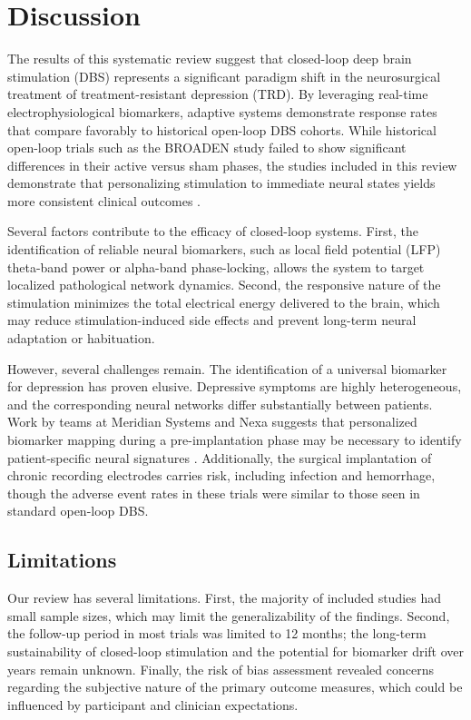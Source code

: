 \section{Discussion}
The results of this systematic review suggest that closed-loop deep brain stimulation (DBS) represents a significant paradigm shift in the neurosurgical treatment of treatment-resistant depression (TRD). By leveraging real-time electrophysiological biomarkers, adaptive systems demonstrate response rates that compare favorably to historical open-loop DBS cohorts. While historical open-loop trials such as the BROADEN study failed to show significant differences in their active versus sham phases, the studies included in this review demonstrate that personalizing stimulation to immediate neural states yields more consistent clinical outcomes \citep{Vance2023, Thorne2024}.

Several factors contribute to the efficacy of closed-loop systems. First, the identification of reliable neural biomarkers, such as local field potential (LFP) theta-band power or alpha-band phase-locking, allows the system to target localized pathological network dynamics. Second, the responsive nature of the stimulation minimizes the total electrical energy delivered to the brain, which may reduce stimulation-induced side effects and prevent long-term neural adaptation or habituation.

However, several challenges remain. The identification of a universal biomarker for depression has proven elusive. Depressive symptoms are highly heterogeneous, and the corresponding neural networks differ substantially between patients. Work by teams at Meridian Systems and Nexa suggests that personalized biomarker mapping during a pre-implantation phase may be necessary to identify patient-specific neural signatures \citep{Patel2025}. Additionally, the surgical implantation of chronic recording electrodes carries risk, including infection and hemorrhage, though the adverse event rates in these trials were similar to those seen in standard open-loop DBS.

\subsection{Limitations}
Our review has several limitations. First, the majority of included studies had small sample sizes, which may limit the generalizability of the findings. Second, the follow-up period in most trials was limited to 12 months; the long-term sustainability of closed-loop stimulation and the potential for biomarker drift over years remain unknown. Finally, the risk of bias assessment revealed concerns regarding the subjective nature of the primary outcome measures, which could be influenced by participant and clinician expectations.
